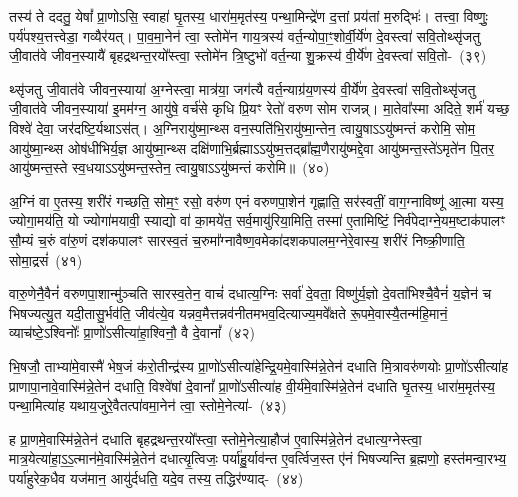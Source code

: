 तस्य॑ ते ददतु॒ येषां᳚ प्रा॒णो\-ऽसि॒ स्वाहा॑ घृ॒तस्य॒ धारा॑म॒मृत॑स्य॒ पन्था॒मिन्द्रे॑ण द॒त्तां प्रय॑तां म॒रुद्भिः॑। तत्त्वा॒ विष्णुः॒ पर्य॑पश्य॒त्तत्त्वेडा॒ गव्यैर॑यत्। पा॒व॒मा॒नेन॑ त्वा॒ स्तोमे॑न गाय॒त्रस्य॑ वर्त॒न्योपा॒ꣳ॒शोर्वी॒र्ये॑ण दे॒वस्त्वा॑ सवि॒तोथ्सृ॑जतु जी॒वात॑वे जीवन॒स्यायै॑ बृहद्रथन्त॒रयो᳚स्त्वा॒ स्तोमे॑न त्रि॒ष्टुभो॑ वर्त॒न्या शु॒क्रस्य॑ वी॒र्ये॑ण दे॒वस्त्वा॑ सवि॒तो-~(३९)\ip

थ्सृ॑जतु जी॒वात॑वे जीवन॒स्याया॑ अ॒ग्नेस्त्वा॒ मात्र॑या॒ जग॑त्यै वर्त॒न्याग्र॑य॒णस्य॑ वी॒र्ये॑ण दे॒वस्त्वा॑ सवि॒तोथ्सृ॑जतु जी॒वात॑वे जीवन॒स्याया॑ इ॒मम॑ग्न॒ आयु॑षे॒ वर्च॑से कृधि प्रि॒यꣳ रेतो॑ वरुण सोम राजन्न्। मा॒तेवा᳚स्मा अदिते॒ शर्म॑ यच्छ॒ विश्वे॑ देवा॒ जर॑दष्टि॒र्यथा\-ऽ\-स॑त्। अ॒ग्निरायु॑ष्मा॒न्थ्स वन॒स्पति॑भि॒रायु॑ष्मा॒न्तेन॒ त्वायु॒षा\-ऽऽ\-यु॑ष्मन्तं करोमि॒ सोम॒ आयु॑ष्मा॒न्थ्स ओष॑धीभिर्य॒ज्ञ आयु॑ष्मा॒न्थ्स दक्षि॑णाभि॒र्ब्रह्मा\-ऽऽ\-यु॑ष्म॒त्तद्ब्रा᳚ह्म॒णैरायु॑ष्मद्दे॒वा आयु॑ष्मन्त॒स्ते॑\-ऽमृते॑न पि॒तर॒ आयु॑ष्मन्त॒स्ते स्व॒धया\-ऽऽ\-यु॑ष्मन्त॒स्तेन॒ त्वायु॒षा\-ऽऽ\-यु॑ष्मन्तं करोमि॥~(४०)\ip

{\anuvakamend[{विश्वे॑षां दे॒वानां᳚ प्रा॒णो॑\-ऽसि त्रि॒ष्टुभो॑ वर्त॒न्या शु॒क्रस्य॑ वी॒र्ये॑ण दे॒वस्त्वा॑ सवि॒तोथ्सोम॒ आयु॑ष्मा॒न्पञ्च॑विꣳशतिश्च}]}%

अ॒ग्निं वा ए॒तस्य॒ शरी॑रं गच्छति॒ सोम॒ꣳ॒ रसो॒ वरु॑ण एनं वरुणपा॒शेन॑ गृह्णाति॒ सर॑स्वतीं॒ वाग॒ग्नाविष्णू॑ आ॒त्मा यस्य॒ ज्योगा॒मय॑ति॒ यो ज्योगा॑मयावी॒ स्याद्यो वा॑ का॒मये॑त॒ सर्व॒मायु॑रिया॒मिति॒ तस्मा॑ ए॒तामिष्टिं॒ निर्व॑पेदाग्ने॒यम॒ष्टाक॑पालꣳ सौ॒म्यं च॒रुं वा॑रु॒णं दश॑\-कपालꣳ सारस्व॒तं च॒रुमा᳚ग्नावैष्ण॒वमेका॑\-दश\-कपालम॒ग्नेरे॒वास्य॒ शरी॑रं निष्क्री॒णाति॒ सोमा॒द्रसं॑~(४१)\ip

वारु॒णेनै॒वैनं॑ वरुणपा॒शान्मु॑ञ्चति सारस्व॒तेन॒ वाचं॑ दधात्य॒ग्निः सर्वा॑ दे॒वता॒ विष्णु॑र्य॒ज्ञो दे॒वता॑भिश्चै॒वैनं॑ य॒ज्ञेन॑ च भिषज्यत्यु॒त यदी॒तासु॒र्भव॑ति॒ जीव॑त्ये॒व यन्नव॒मैत्तन्नव॑नीतमभव॒दित्याज्य॒मवे᳚क्षते रू॒पमे॒वास्यै॒तन्म॑हि॒मानं॒ व्याच॑ष्टे॒\-ऽश्विनोः᳚ प्रा॒णो॑\-ऽसीत्या॑हा॒श्विनौ॒ वै दे॒वानां᳚~(४२)\ip

भि॒षजौ॒ ताभ्या॑मे॒वास्मै॑ भेष॒जं क॑रो॒तीन्द्र॑स्य प्रा॒णो॑\-ऽसीत्या॑हेन्द्रि॒यमे॒वास्मि॑न्ने॒तेन॑ दधाति मि॒त्रावरु॑णयोः प्रा॒णो॑\-ऽसीत्या॑ह प्राणापा॒नावे॒वास्मि॑न्ने॒तेन॑ दधाति॒ विश्वे॑षां दे॒वानां᳚ प्रा॒णो॑\-ऽसीत्या॑ह वी॒र्य॑मे॒वास्मि॑न्ने॒तेन॑ दधाति घृ॒तस्य॒ धारा॑म॒मृत॑स्य॒ पन्था॒मित्या॑ह यथाय॒जुरे॒वैतत्पा॑वमा॒नेन॑ त्वा॒ स्तोमे॒नेत्या॑-~(४३)\ip

ह प्रा॒णमे॒वास्मि॑न्ने॒तेन॑ दधाति बृहद्रथन्त॒रयो᳚स्त्वा॒ स्तोमे॒नेत्या॒हौज॑ ए॒वास्मि॑न्ने॒तेन॑ दधात्य॒ग्नेस्त्वा॒ मात्र॒येत्या॑\-हा॒\-ऽ॒\-ऽ॒\-त्मान॑\-मे॒वास्मि॑न्ने॒तेन॑ दधात्यृ॒त्विजः॒ पर्या॑हु॒र्याव॑न्त ए॒वर्त्विज॒स्त ए॑नं भिषज्यन्ति ब्र॒ह्मणो॒ हस्त॑मन्वा॒रभ्य॒ पर्या॑हुरेक॒धैव यज॑मान॒ आयु॑र्दधति॒ यदे॒व तस्य॒ तद्धिर॑ण्याद्-~(४४)\ip

